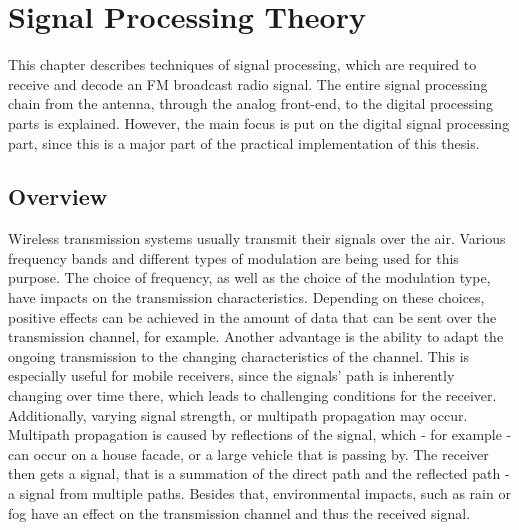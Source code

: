 \chapter{Signal Processing Theory}
\label{cha:TheThesis}

This chapter describes techniques of signal processing, which are required to receive and decode an FM broadcast radio signal.
The entire signal processing chain from the antenna, through the analog front-end, to the digital processing parts is explained.
However, the main focus is put on the digital signal processing part, since this is a major part of the practical implementation of this thesis.

\section{Overview}

Wireless transmission systems usually transmit their signals over the air.
Various frequency bands and different types of modulation are being used for this purpose.
The choice of frequency, as well as the choice of the modulation type, have impacts on the transmission characteristics.
Depending on these choices, positive effects can be achieved in the amount of data that can be sent over the transmission channel, for example.
Another advantage is the ability to adapt the ongoing transmission to the changing characteristics of the channel.
This is especially useful for mobile receivers, since the signals' path is inherently changing over time there, which leads to challenging conditions for the receiver.
Additionally, varying signal strength, or multipath propagation may occur.
Multipath propagation is caused by reflections of the signal, which - for example - can occur on a house facade, or a large vehicle that is passing by.
The receiver then gets a signal, that is a summation of the direct path and the reflected path - a signal from multiple paths.
Besides that, environmental impacts, such as rain or fog have an effect on the transmission channel and thus the received signal.\\

